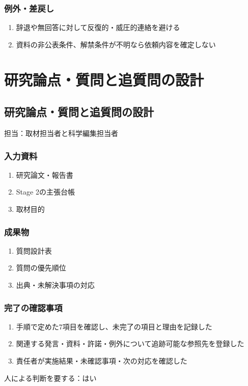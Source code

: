 \documentclass[a4paper,11pt]{article}
\begin{document}
\subsubsection*{例外・差戻し}
\begin{enumerate}[leftmargin=2em,itemsep=0.35em]
\item 辞退や無回答に対して反復的・威圧的連絡を避ける
\item 資料の非公表条件、解禁条件が不明なら依頼内容を確定しない
\end{enumerate}
\section{研究論点・質問と追質問の設計}
\subsection{研究論点・質問と追質問の設計}
\par 担当：取材担当者と科学編集担当者\par\medskip
\subsubsection*{入力資料}
\begin{enumerate}[leftmargin=2em,itemsep=0.35em]
\item 研究論文・報告書
\item Stage 2の主張台帳
\item 取材目的
\end{enumerate}
\subsubsection*{成果物}
\begin{enumerate}[leftmargin=2em,itemsep=0.35em]
\item 質問設計表
\item 質問の優先順位
\item 出典・未解決事項の対応
\end{enumerate}
\subsubsection*{完了の確認事項}
\begin{enumerate}[leftmargin=2em,itemsep=0.35em]
\item 手順で定めた7項目を確認し、未完了の項目と理由を記録した
\item 関連する発言・資料・許諾・例外について追跡可能な参照先を登録した
\item 責任者が実施結果・未確認事項・次の対応を確認した
\end{enumerate}
\par 人による判断を要する：はい\par\medskip
\end{document}
